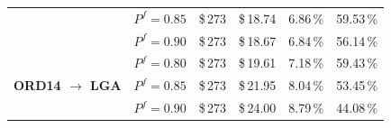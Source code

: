 \begin{center}
\begin{longtable}{l c | c c c c}
    ~  &  $P^f = 0.85$  &  \$\,273  & \$\,18.74  & 6.86\,\%     & 59.53\,\% \\ 
    ~  &  $P^f = 0.90$  &  \$\,273  & \$\,18.67  & 6.84\,\%     & 56.14\,\% \\ 
    \hline
    \multirow{4}{*}{\parbox[c]{1cm}{\centering \textbf{  ORD14  $\to$  LGA  }}}
    ~  &  $P^f = 0.80$  &  \$\,273  & \$\,19.61  & 7.18\,\%     & 59.43\,\% \\ 
    ~  &  $P^f = 0.85$  &  \$\,273  & \$\,21.95  & 8.04\,\%     & 53.45\,\% \\ 
    ~  &  $P^f = 0.90$  &  \$\,273  & \$\,24.00  & 8.79\,\%     & 44.08\,\% \\ 

\end{longtable}
\end{center}









